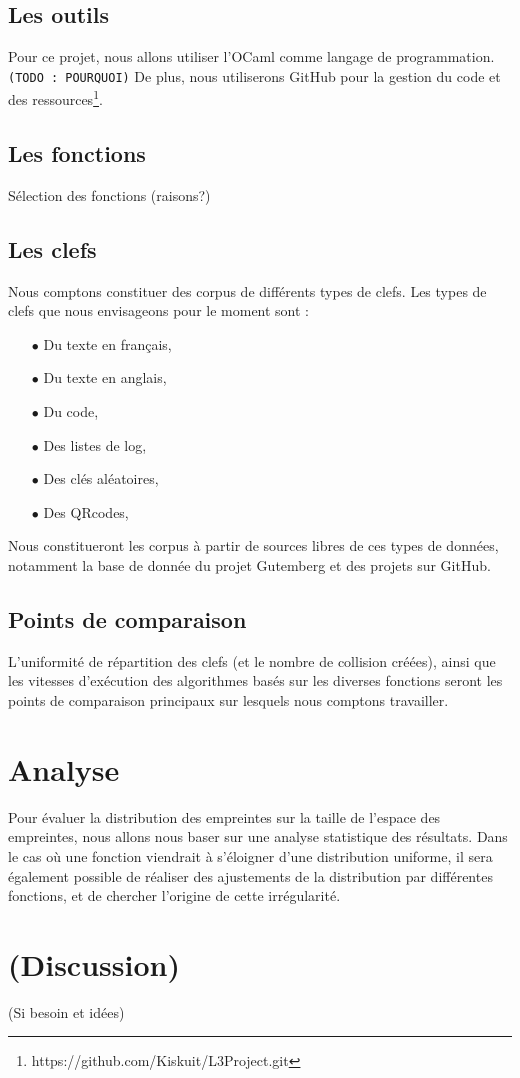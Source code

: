 \documentclass[final,twoside,twocolumn,10pt]{scrartcl}
\begin{document}
	\subsection{Les outils}
		Pour ce projet, nous allons utiliser l'OCaml comme langage de programmation. \texttt{(TODO : POURQUOI)}
		De plus, nous utiliserons GitHub pour la gestion du code et des ressources\footnote{https://github.com/Kiskuit/L3Project.git}.
		
	\subsection{Les fonctions}
		Sélection des fonctions (raisons?)
		
	\subsection{Les clefs}
		Nous comptons constituer des corpus de différents types de clefs. Les types de clefs que nous envisageons pour le moment sont :
		\begin{itemize}
			\item[$\bullet$]Du texte en français,
			\item[$\bullet$]Du texte en anglais,
			\item[$\bullet$]Du code,
			\item[$\bullet$]Des listes de log,
			\item[$\bullet$]Des clés aléatoires,
			\item[$\bullet$]Des QRcodes,
		\end{itemize}
		Nous constitueront les corpus à partir de sources libres de ces types de données, notamment la base de donnée du projet Gutemberg et des projets sur GitHub.
		
	\subsection{Points de comparaison}
		L'uniformité de répartition des clefs (et le nombre de collision créées), ainsi que les vitesses d'exécution des algorithmes basés sur les diverses fonctions seront les points de comparaison principaux sur lesquels nous comptons travailler.

\section{Analyse}
	Pour évaluer la distribution des empreintes sur la taille de l'espace des empreintes, nous allons nous baser sur une analyse statistique des résultats. Dans le cas où une fonction viendrait à s'éloigner d'une distribution uniforme, il sera également possible de réaliser des ajustements de la distribution par différentes fonctions, et de chercher l'origine de cette irrégularité.

\section{(Discussion)}
	(Si besoin et idées)

%
\end{document}
